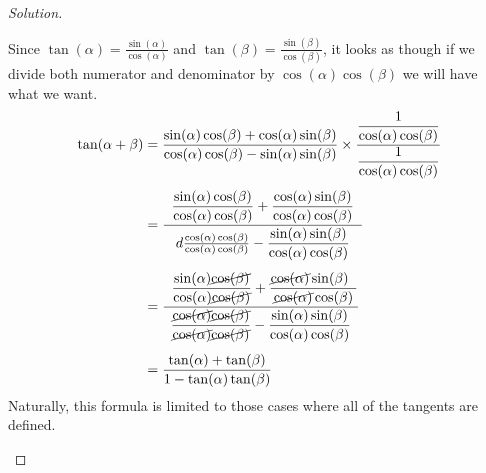 \documentclass{ximera}
\begin{document}
\begin{example}
\begin{proof}[Solution]
\begin{enumerate}
      Since \( \tan(\alpha) = \frac{\sin(\alpha)}{\cos(\alpha)} \) and \( \tan(\beta) = \frac{\sin(\beta)}{\cos(\beta)} \), it looks as though if we divide both numerator and denominator by \( \cos(\alpha)\cos(\beta) \) we will have what we want.
      \begin{align*}
        \tan(\alpha + \beta) &= \frac{\sin(\alpha) \cos(\beta) + \cos(\alpha) \sin(\beta)}{\cos(\alpha) \cos(\beta) - \sin(\alpha) \sin(\beta)} \times \frac{\dfrac{1}{\cos(\alpha) \cos(\beta)}}{\dfrac{1}{\cos(\alpha) \cos(\beta)}}\\[1ex]
        &= \frac{\;\;\dfrac{\sin(\alpha) \cos(\beta)}{\cos(\alpha) \cos(\beta)} + \dfrac{\cos(\alpha) \sin(\beta)}{\cos(\alpha) \cos(\beta)}\;\;}{d\frac{\cos(\alpha) \cos(\beta)}{\cos(\alpha) \cos(\beta)} - \dfrac{\sin(\alpha) \sin(\beta)}{\cos(\alpha) \cos(\beta)}}\\[1ex]
        &= \frac{\;\;\dfrac{\sin(\alpha) \cancel{\cos(\beta)}}{\cos(\alpha) \cancel{\cos(\beta)}} + \dfrac{\cancel{\cos(\alpha)} \sin(\beta)\;\;}{\cancel{\cos(\alpha)} \cos(\beta)}}{\dfrac{\cancel{\cos(\alpha)} \cancel{\cos(\beta)}}{\cancel{\cos(\alpha)} \cancel{\cos(\beta)}} - \dfrac{\sin(\alpha) \sin(\beta)}{\cos(\alpha) \cos(\beta)}}\\[1ex]
        &= \frac{\tan(\alpha) + \tan(\beta)}{1 -\tan(\alpha) \tan(\beta)}
      \end{align*}
      Naturally, this formula is limited to those cases where all of the tangents are defined.
    \end{enumerate}
  \end{proof}
\end{example}
\end{document}
